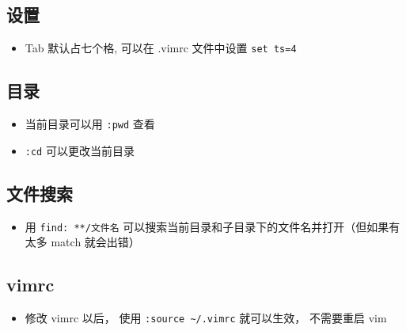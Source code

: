\subsection{设置}
\begin{itemize}
\item Tab 默认占七个格, 可以在 .vimrc 文件中设置 \verb`set ts=4`
\end{itemize}

\subsection{目录}
\begin{itemize}
\item 当前目录可以用 \verb`:pwd` 查看
\item \verb`:cd` 可以更改当前目录
\end{itemize}

\subsection{文件搜索}
\begin{itemize}
\item 用 \verb`find: **/文件名` 可以搜索当前目录和子目录下的文件名并打开（但如果有太多 match 就会出错）
\end{itemize}

\subsection{vimrc}
\begin{itemize}
\item 修改 vimrc 以后， 使用 \verb`:source ~/.vimrc` 就可以生效， 不需要重启 vim
\end{itemize}

